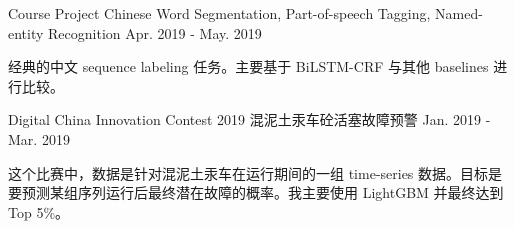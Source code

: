 \begin{cventries}
  \cventry
    {Course Project} %
    {Chinese Word Segmentation, Part-of-speech Tagging, Named-entity Recognition} %
    {} %
    {Apr. 2019 - May. 2019} %
    {
      \begin{cvitems} %
        \item {经典的中文 sequence labeling 任务。主要基于 BiLSTM-CRF 与其他 baselines 进行比较。}
      \end{cvitems}
    }

  \cventry
    {Digital China Innovation Contest 2019} %
    {混泥土汞车砼活塞故障预警} %
    {} %
    {Jan. 2019 - Mar. 2019} %
    {
      \begin{cvitems} %
        \item {这个比赛中，数据是针对混泥土汞车在运行期间的一组 time-series 数据。目标是要预测某组序列运行后最终潜在故障的概率。我主要使用 LightGBM 并最终达到 Top 5\%。}
      \end{cvitems}
    }

\end{cventries}
